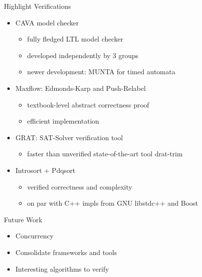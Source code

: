 \documentclass[fleqn]{beamer}
\begin{document}
\begin{frame}{Highlight Verifications}
  \begin{itemize}
   \item<+-> CAVA model checker
    \begin{itemize}
     \item fully fledged LTL model checker
     \item developed independently by 3 groups
     \item newer development: MUNTA for timed automata
    \end{itemize}
   \item<+-> Maxflow: Edmonds-Karp and Push-Relabel
    \begin{itemize}
     \item textbook-level abstract correctness proof
     \item efficient implementation
    \end{itemize}
   \item<+-> GRAT: SAT-Solver verification tool
    \begin{itemize}
     \item faster than unverified state-of-the-art tool drat-trim
    \end{itemize}
   \item<+-> Introsort + Pdqsort
    \begin{itemize}
     \item verified correctness and complexity
     \item on par with C++ impls from GNU libstdc++ and Boost

    \end{itemize}
  \end{itemize}
\end{frame}
\begin{frame}{Future Work}
  \begin{itemize}
   \item Concurrency
   \item Consolidate frameworks and tools
   \item Interesting algorithms to verify

  \end{itemize}
\end{frame}
\end{document}
